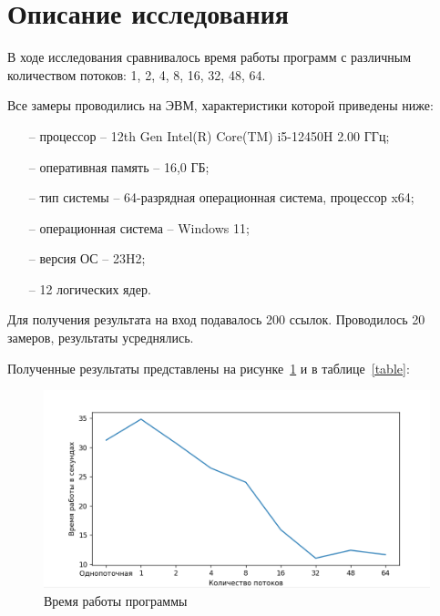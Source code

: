 \documentclass{article}
\begin{document}
\clearpage\section{Описание исследования}
В ходе исследования сравнивалось время работы программ с различным количеством потоков: 1, 2, 4, 8, 16, 32, 48, 64.

Все замеры проводились на ЭВМ, характеристики которой приведены ниже:
\begin{itemize}
	\item[--] процессор -- 12th Gen Intel(R) Core(TM) i5-12450H   2.00 ГГц;
	\item[--] оперативная память -- 16,0 ГБ;
	\item[--] тип системы -- 64-разрядная операционная система, процессор x64;
	\item[--] операционная система -- Windows 11;
	\item[--] версия ОС -- 23H2;
	\item[--] 12 логических ядер.
\end{itemize}

Для получения результата на вход подавалось 200 ссылок. Проводилось 20 замеров, результаты усреднялись.

Полученные результаты представлены на рисунке~\ref{time} и в таблице~\ref{table}:
\begin{figure}[h]
	\centering
	\includegraphics[scale=0.8]{tools/time.png}
	\caption{Время работы программы}
	\label{time}
\end{figure}
\end{document}
